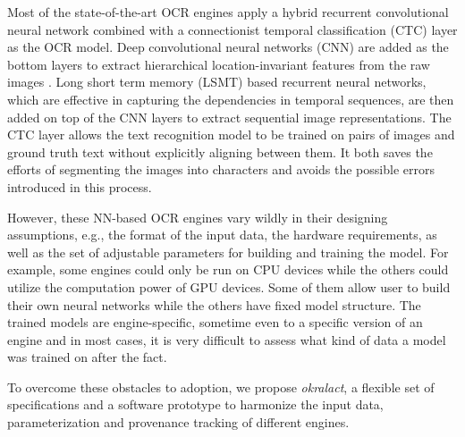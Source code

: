 \documentclass[conference]{IEEEtran}
\begin{document}
Most of the state-of-the-art OCR engines apply a hybrid recurrent convolutional neural network combined with a connectionist temporal classification (CTC) \cite{graves2006connectionist} layer as the OCR model. Deep convolutional neural networks (CNN) \cite{krizhevsky2012imagenet}  are added as the bottom layers to extract hierarchical location-invariant features from the raw images \cite{wick2018improving}. Long short term memory (LSMT) \cite{hochreiter1997long} based recurrent neural networks, which are effective in capturing the dependencies in temporal sequences, are then added on top of the CNN layers to extract sequential image representations. The CTC layer allows the text recognition model to be trained on pairs of images and ground truth text without explicitly aligning between them. It both saves the efforts of segmenting the images into characters and avoids the possible errors introduced in this process. 

However, these NN-based OCR engines vary wildly in their designing assumptions, e.g., the format of the input data, the hardware requirements, as well as the set of adjustable parameters for building and training the model. For example, some engines could only be run on CPU devices while the others could utilize the computation power of GPU devices. Some of them allow user to build their own neural networks while the others have fixed model structure. The trained models are engine-specific, sometime even to a specific version of an engine and in most cases, it is very difficult to assess what kind of data a model was trained on after the fact.


To overcome these obstacles to adoption, we propose \textit{okralact}, a flexible set of specifications
and a software prototype to harmonize the input data, parameterization and provenance
tracking of different engines. 
\end{document}
